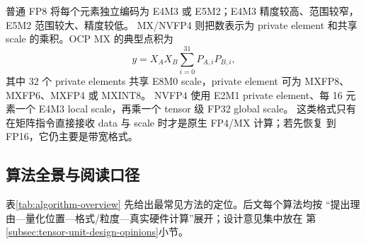 普通 FP8 将每个元素独立编码为 E4M3 或 E5M2；E4M3 精度较高、范围较窄，
E5M2 范围较大、精度较低。
MX/NVFP4 则把数表示为 private element 和共享 scale 的乘积。OCP MX 的典型点积为
\begin{equation}
  y=X_A X_B\sum_{i=0}^{31}P_{A,i}P_{B,i},
  \label{eq:mx-dot}
\end{equation}
其中 32 个 private elements 共享 E8M0 scale，private element 可为
MXFP8、MXFP6、MXFP4 或 MXINT8。
NVFP4 使用 E2M1 private element、每 16 元素一个 E4M3 local scale，再乘一个
tensor 级 FP32 global scale。
这类格式只有在矩阵指令直接接收 data 与 scale 时才是原生 FP4/MX 计算；若先恢复
到 FP16，它仍主要是带宽格式。

\subsection{算法全景与阅读口径}

表\ref{tab:algorithm-overview} 先给出最常见方法的定位。后文每个算法均按
“提出理由---量化位置---格式/粒度---真实硬件计算”展开；设计意见集中放在
第\ref{subsec:tensor-unit-design-opinions}小节。

